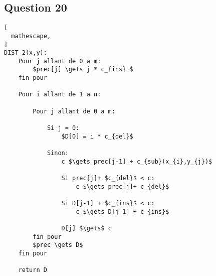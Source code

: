 \documentclass{report}
\begin{document}
\subsection*{Question 20}
\begin{lstlisting}[
  mathescape,
]
DIST_2(x,y):
    Pour j allant de 0 a m:
        $prec[j] \gets j * c_{ins} $
    fin pour
    
    Pour i allant de 1 a n:
    
        Pour j allant de 0 a m:
        
            Si j = 0:
                $D[0] = i * c_{del}$
                
            Sinon:
                c $\gets prec[j-1] + c_{sub}(x_{i},y_{j})$
                    
                Si prec[j]+ $c_{del}$ < c:
                    c $\gets prec[j]+ c_{del}$

                Si D[j-1] + $c_{ins}$ < c:
                    c $\gets D[j-1] + c_{ins}$
                        
                D[j] $\gets$ c
        fin pour
        $prec \gets D$
    fin pour
    
    return D

\end{lstlisting}
\end{document}
